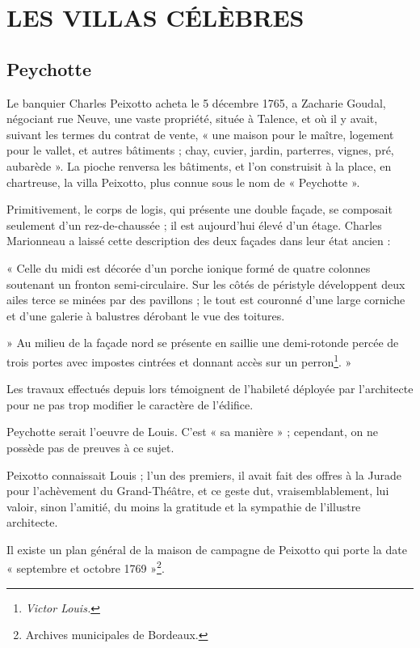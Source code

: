 
\section{LES VILLAS CÉLÈBRES}
\subsection{Peychotte}

Le banquier Charles Peixotto acheta le 5 décembre 1765, a Zacharie Goudal, négociant rue Neuve, une vaste propriété, située à Talence, et où il y avait, suivant les termes du contrat de vente, « une maison pour le maître, logement pour le vallet, et autres bâtiments ; chay, cuvier, jardin, parterres, vignes, pré, aubarède ». La pioche renversa les bâtiments, et l'on construisit à la place, en chartreuse, la villa Peixotto, plus connue sous le nom de « Peychotte ».

Primitivement, le corps de logis, qui présente une double façade, se composait seulement d'un rez-de-chaussée ; il est aujourd'hui élevé d'un étage. Charles Marionneau a laissé cette description des deux façades dans leur état ancien :

« Celle du midi est décorée d'un porche ionique formé de quatre colonnes soutenant un fronton semi-circulaire. Sur les côtés de péristyle développent deux ailes terce se minées par des pavillons ; le tout est couronné d'une large corniche et d'une galerie à balustres dérobant le vue des toitures.

» Au milieu de la façade nord se présente en saillie une demi-rotonde percée de trois portes avec impostes cintrées et donnant accès sur un perron\footnote{\textit{Victor Louis.}}. »

Les travaux effectués depuis lors témoignent de l'habileté déployée par l'architecte pour ne pas trop modifier le caractère de l'édifice.

Peychotte serait l'oeuvre de Louis. C'est « sa manière » ; cependant, on ne possède pas de preuves à ce sujet.

Peixotto connaissait Louis ; l'un des premiers, il avait fait des offres à la Jurade pour l'achèvement du Grand-Théâtre, et ce geste dut, vraisemblablement, lui valoir, sinon l'amitié, du moins la gratitude et la sympathie de l'illustre architecte.

Il existe un plan général de la maison de campagne de Peixotto qui porte la date « septembre et octobre 1769 »\footnote{Archives municipales de Bordeaux.}.

